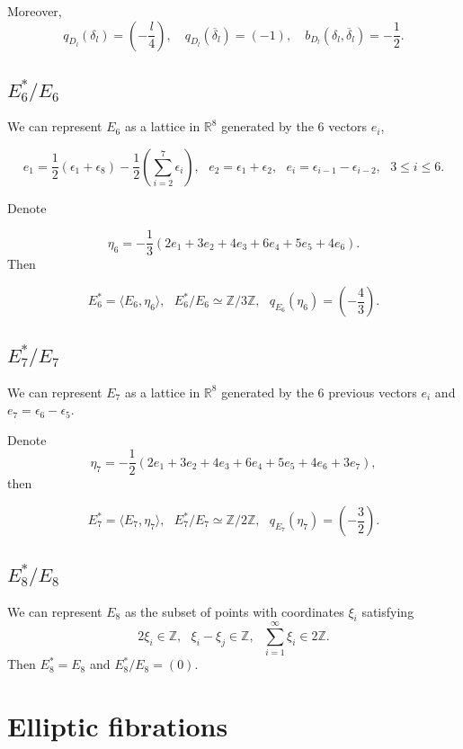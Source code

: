 \documentclass{amsart}
\begin{document}
Moreover,
$$q_{D_l}(\delta_l)=\left ( - \frac {l}{4} \right ), \,\,\,\,\,\,q_{D_l}(\overline{\delta}_l)=(-1), \,\,\,\,\,\,b_{D_l}(\delta_l,\overline{\delta}_l)=-\frac {1}{2}.$$




\subsection{{\bf{$E_6^*/E_6$}}}


We can represent $E_6$ as a lattice in $\mathbb R^8$ generated by the $6$ vectors $e_i$,


$$
e_1  =  \frac {1}{2}(\epsilon_1 +\epsilon _8)-\frac {1}{2} (\sum_{i=2}^{7}\epsilon_i),  \,\,\,\,e_2= \epsilon_1+\epsilon_2, \,\,\,\, e_i=\epsilon_{i-1}-\epsilon_{i-2}, \,\,\,\, 3\leq i \leq 6.$$




Denote

$$\eta_6 =-\frac {1}{3}(2e_1+3e_2+4e_3+6e_4+5e_5+4e_6).$$
Then

$$E_6^*=\langle E_6, \eta_6 \rangle , \,\,\,\,E_6^*/E_6\simeq \mathbb Z /3 \mathbb Z ,\,\,\,\, q_{E_6}(\eta_6)=\left( -\frac {4}{3} \right ).$$



\subsection{{\bf{$E_7^*/E_7$}}}

We can represent $E_7$ as a lattice in $\mathbb R^8$ generated by the $6$ previous vectors $e_i$ and $e_7=\epsilon_6 -\epsilon_5$.


Denote
$$\eta_7 =-\frac {1}{2}(2e_1+3e_2+4e_3+6e_4+5e_5+4e_6+3e_7),$$
then

$$E_7^*=\langle E_7, \eta_7 \rangle, \,\,\,\,E_7^*/E_7 \simeq \mathbb Z /2 \mathbb Z , \,\,\,\,q_{E_7}(\eta_7)=\left(-\frac {3}{2} \right).$$


\subsection{{\bf{$E_8^*/E_8$}}}


We can represent $E_8$ as the subset of points with coordinates $\xi_i$ satisfying
$$2\xi_i \in \mathbb Z, \,\,\,\,\xi_i-\xi_j \in \mathbb Z, \,\,\,\, \sum_{i=1}^{\infty} \xi_i \in 2 \mathbb Z.$$
Then $E_8^*=E_8$ and $E_8^*/E_8=(0)$.





\section{Elliptic fibrations}
\end{document}
